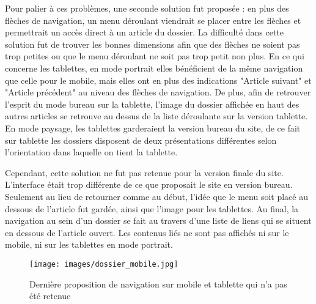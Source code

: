 \documentclass[12pt,a4paper]{article}
\begin{document}
Pour palier à ces problèmes, une seconde solution fut proposée : en plus des flèches de navigation, un menu déroulant viendrait se placer entre les flèches et permettrait un accès direct à un article du dossier. La difficulté dans cette solution fut de trouver les bonnes dimensions afin que des flèches ne soient pas trop petites ou que le menu déroulant ne soit pas trop petit non plus. En ce qui concerne les tablettes, en mode portrait elles bénéficient de la même navigation que celle pour le mobile, mais elles ont en plus des indications "Article suivant" et "Article précédent" au niveau des flèches de navigation. De plus, afin de retrouver l'esprit du mode bureau sur la tablette, l'image du dossier affichée en haut des autres articles se retrouve au dessus de la liste déroulante sur la version tablette. En mode paysage, les tablettes garderaient la version bureau du site, de ce fait sur tablette les dossiers disposent de deux présentations différentes selon l'orientation dans laquelle on tient la tablette.\par
Cependant, cette solution ne fut pas retenue pour la version finale du site. L'interface était trop différente de ce que proposait le site en version bureau. Seulement au lieu de retourner comme au début, l'idée que le menu soit placé au dessous de l'article fut gardée, ainsi que l'image pour les tablettes. Au final, la navigation au sein d'un dossier se fait au travers d'une liste de liens qui se situent en dessous de l'article ouvert. Les contenus liés ne sont pas affichés ni sur le mobile, ni sur les tablettes en mode portrait.\par

\begin{figure}[h!]
\centering\texttt{[image: images/dossier\_mobile.jpg]} 
\caption{Dernière proposition de navigation sur mobile et tablette qui n'a pas été retenue}
\end{figure}

\newpage
\end{document}
